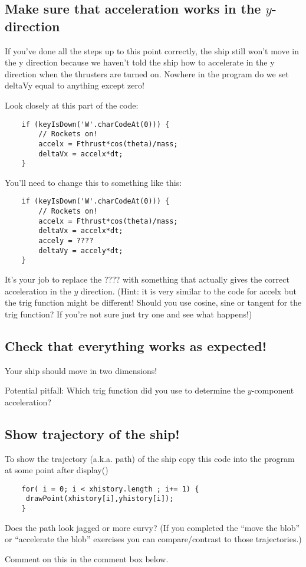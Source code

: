 \documentclass{ximera}
\begin{document}
\subsection{Make sure that acceleration works in the $y$-direction}

If you've done all the steps up to this point correctly, the ship
still won't move in the y direction because we haven't told the ship
how to accelerate in the y direction when the thrusters are turned
on. Nowhere in the program do we set deltaVy equal to anything except
zero!

Look closely at this part of the code:
\begin{verbatim}
    if (keyIsDown('W'.charCodeAt(0))) {
        // Rockets on!
        accelx = Fthrust*cos(theta)/mass;
        deltaVx = accelx*dt;
    }
\end{verbatim}
You'll need to change this to something like this:
\begin{verbatim}
    if (keyIsDown('W'.charCodeAt(0))) {
        // Rockets on!
        accelx = Fthrust*cos(theta)/mass;
        deltaVx = accelx*dt;
        accely = ????
        deltaVy = accely*dt;
    }
\end{verbatim}
It's your job to replace the ???? with something that actually gives
the correct acceleration in the $y$ direction. (Hint: it is very
similar to the code for accelx but the trig function might be
different! Should you use cosine, sine or tangent for the trig
function? If you're not sure just try one and see what happens!)

\subsection{Check that everything works as expected!}

Your ship should move in two dimensions!

Potential pitfall: Which trig function did you use to determine the $y$-component acceleration?
\begin{multipleChoice}
\end{multipleChoice}

\subsection{Show trajectory of the ship!}

To show the trajectory (a.k.a. path) of the ship copy this code into
the program at some point after display()
\begin{verbatim}
    for( i = 0; i < xhistory.length ; i+= 1) {
     drawPoint(xhistory[i],yhistory[i]); 
    }
\end{verbatim}

Does the path look jagged or more curvy? (If you completed the ``move
the blob'' or ``accelerate the blob'' exercises you can
compare/contrast to those trajectories.)

Comment on this in the comment box below.
\begin{freeResponse}  
\end{freeResponse}
\end{document}

